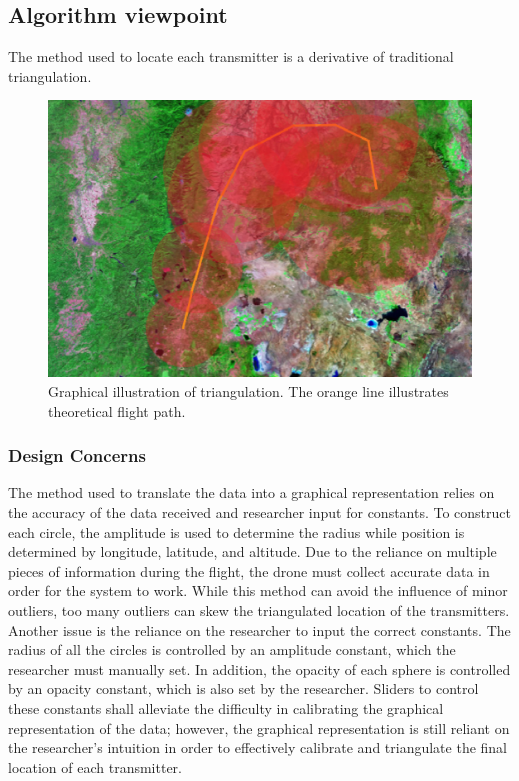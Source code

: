 \documentclass[onecolumn, draftclsnofoot,10pt, compsoc]{IEEEtran}
\begin{document}
\subsection{Algorithm viewpoint}
The method used to locate each transmitter is a derivative of traditional triangulation.
\begin{figure}[h]
\includegraphics[width=7in]{satelliteMap.eps}
\captionsetup{justification=centering}
\caption{Graphical illustration of triangulation. The orange line illustrates theoretical flight path.}
\centering
\end{figure}
\subsubsection{Design Concerns}
The method used to translate the data into a graphical representation relies on the accuracy of the data received and researcher input for constants.
To construct each circle, the amplitude is used to determine the radius while position is determined by longitude, latitude, and altitude.
Due to the reliance on multiple pieces of information during the flight, the drone must collect accurate data in order for the system to work.
While this method can avoid the influence of minor outliers, too many outliers can skew the triangulated location of the transmitters.
Another issue is the reliance on the researcher to input the correct constants.
The radius of all the circles is controlled by an amplitude constant, which the researcher must manually set.
In addition, the opacity of each sphere is controlled by an opacity constant, which is also set by the researcher.
Sliders to control these constants shall alleviate the difficulty in calibrating the graphical representation of the data; however, the graphical representation is still reliant on the researcher's intuition in order to effectively calibrate and triangulate the final location of each transmitter.
\end{document}
